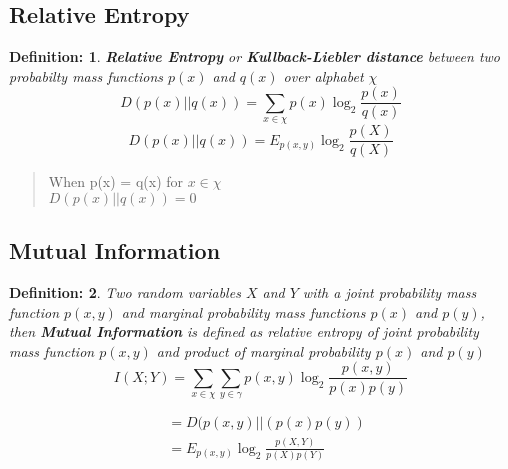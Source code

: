 \documentclass[11pt]{article}
\newtheorem{defn}{Definition:}
\begin{document}
\subsection{Relative Entropy}
\begin{defn}
\textbf{Relative Entropy} or \textbf{Kullback-Liebler distance} between two probabilty mass functions $p(x)$ and $q(x)$ over alphabet $\chi$
\begin{equation}
D(p(x)||q(x))=\sum \limits_{x \in \chi} p(x) \log_{2}\frac{p(x)}{q(x)}
\end{equation}
\begin{equation}
D(p(x)||q(x))=E_{p(x,y)}\log_{2} \frac{p(X)}{q(X)}
\end{equation}

\end{defn}

\begin{verse}
When p(x) = q(x) for $ x \in \chi $\\
$D(p(x)||q(x))=0$
\end{verse}

\subsection{Mutual Information}
\begin{defn}
Two random variables $X$ and $Y$ with a joint probability mass function $p(x,y)$ and marginal probability mass functions $p(x)$ and $p(y)$, then \textbf{Mutual Information} is defined as relative entropy of joint probability mass function $p(x,y)$ and product of marginal probability $p(x)$ and $p(y)$
\begin{equation}
I(X;Y)=\sum \limits_{x \in \chi} \sum \limits_{y \in \gamma} p(x,y)\log_{2}\frac{p(x,y)}{p(x)p(y)}
\end{equation} 

\begin{align*}
&=D(p(x,y)||(p(x)p(y))\\
&=E_{p(x,y)}\log_{2}\frac{p(X,Y)}{p(X)p(Y)}
\end{align*}
\end{defn}
\end{document}
